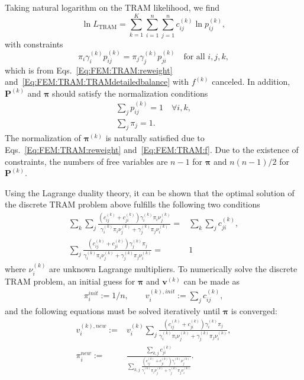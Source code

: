 Taking natural logarithm on the TRAM likelihood, we find
\begin{equation}
    \ln{L_{\mathrm{TRAM}}}=\sum_{k=1}^{K}\sum_{i=1}^n\sum_{j=1}^{n}c_{ij}^{(k)}\ln{p_{ij}^{(k)}},
\end{equation}
with constraints
\begin{equation}
    \pi_i\gamma_i^{(k)}p_{ij}^{(k)}=\pi_j\gamma_j^{(k)}p_{ji}^{(k)}\quad \text{for all }i,j,k,
\end{equation}
which is from Eqs.~\ref{Eq:FEM:TRAM:reweight} and~\ref{Eq:FEM:TRAM:TRAMdetailedbalance} with $f^{(k)}$ canceled. In addition, $\mathbf{P}^{(k)}$ and $\boldsymbol{\pi}$ should satisfy the normalization conditions
\begin{align}
	\sum_{j}p_{ij}^{(k)}=1 \quad \forall i,k,\\
	\sum_j \pi_j=1.
\end{align}
The normalization of $\boldsymbol{\pi}^{(k)}$ is naturally satisfied due to Eqs.~\ref{Eq:FEM:TRAM:reweight} and~\ref{Eq:FEM:TRAM:f}. Due to the existence of constraints, the numbers of free variables are $n-1$ for $\boldsymbol{\pi}$ and $n(n-1)/2$ for $\mathbf{P}^{(k)}$.

Using the Lagrange duality theory, it can be shown that the optimal solution of the discrete TRAM problem above fulfills the following two conditions
\begin{align}
	\sum_k\sum_j\frac{\left(c_{ij}^{(k)}+c_{ji}^{(k)}\right)\gamma_i^{(k)}\pi_i\nu_j^{(k)}}{\gamma_i^{(k)}\pi_i\nu_j^{(k)}+\gamma_j^{(k)}\pi_j\nu_i^{(k)}}=&\sum_k\sum_jc_{ji}^{(k)},\\
	\sum_j\frac{\left(c_{ij}^{(k)}+c_{ji}^{(k)}\right)\gamma_j^{(k)}\pi_j}{\gamma_i^{(k)}\pi_i\nu_j^{(k)}+\gamma_j^{(k)}\pi_j\nu_i^{(k)}}=&1
\end{align}
where $\nu_i^{(k)}$ are unknown Lagrange multipliers. To numerically solve the discrete TRAM problem, an initial guess for $\boldsymbol{\pi}$ and $\mathbf{v}^{(k)}$ can be made as
\begin{align}
	\pi_i^{init}:=1/n,\qquad
	v_i^{(k),init}:=\sum_j c_{ij}^{(k)},
\end{align}
and the following equations must be solved iteratively until $\boldsymbol{\pi}$ is converged:
\begin{align}
	v_i^{(k),new}:=&v_i^{(k)}\sum_j \frac{\left(c_{ij}^{(k)}+c_{ji}^{(k)}\right)\gamma_i^{(k)}\pi_j}{\gamma_i^{(k)}\pi_i\nu_j^{(k)}+\gamma_j^{(k)}\pi_j\nu_i^{(k)}},\\
	\pi_i^{new}:=&\frac{\sum_{k,j}c_{ji}^{(k)}}{\sum_{k,j}\frac{\left(c_{ij}^{(k)}+c_{ji}^{(k)}\right)\gamma_i^{(k)}\nu_j^{(k)}}{\gamma_i^{(k)}\pi_i\nu_j^{(k)}+\gamma_j^{(k)}\pi_j\nu_i^{(k)}}}.
\end{align}